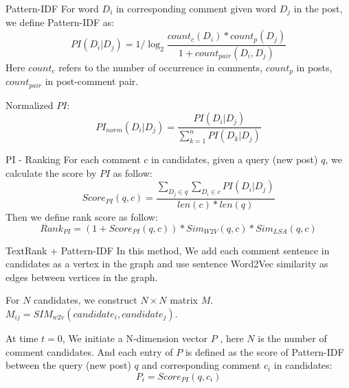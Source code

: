 \documentclass{beamer}
\begin{document}
    \begin{frame}{Pattern-IDF}
      For word $D_i$ in corresponding comment given word $D_j$ in the post, we 
      define Pattern-IDF as:
      \begin{equation}
        PI(D_i|D_j) = 1 / \log_2{\frac{count_c(D_i) * count_p(D_j)}{1+count_{pair}(D_i, D_j)}}
      \end{equation}
      Here $count_c$ refers to the number of occurrence in comments, $count_p$ in posts, $count_{pair}$ in post-comment pair.

      Normalized $PI$:
      \begin{equation}
        PI_{norm}(D_i|D_j) = \frac{PI(D_i|D_j)}{\sum_{k=1}^n{PI(D_k|D_j)}}
      \end{equation}
    \end{frame}

    \begin{frame}{PI - Ranking}
      For each comment $c$ in candidates, given a query (new post) $q$, we 
      calculate the score by $PI$ as follow:
      \begin{equation}
        Score_{PI}(q, c) = \frac{\sum_{D_j \in q}{\sum_{D_i \in c}{PI(D_i|D_j)}}}{len(c) * len(q)}
      \end{equation}
      Then we define rank score as follow:
      \begin{equation}
        Rank_{PI} = (1 + Score_{PI}(q, c)) * Sim_{W2V}(q, c)*Sim_{LSA}(q, c)  
      \end{equation}
    \end{frame}

    \begin{frame}{TextRank + Pattern-IDF}
      In this method, We add each comment sentence in candidates as a vertex in the graph and use sentence Word2Vec similarity as edges between vertices in the graph.

      For $N$ candidates, we construct $ N \times N $ matrix $M$. $M_{ij} = SIM_{w2v}(candidate_i, candidate_j)$. 

      At time $t = 0$, We initiate a N-dimension vector $P$ , here $N$ is the number 
      of comment candidates. And each entry of $P$ is defined as the score of Pattern-IDF between the query (new post) $q$ and corresponding comment $c_i$ in candidates:
      \begin{equation}
        P_i = Score_{PI}(q, c_i)
      \end{equation}
    \end{frame}
\end{document}
